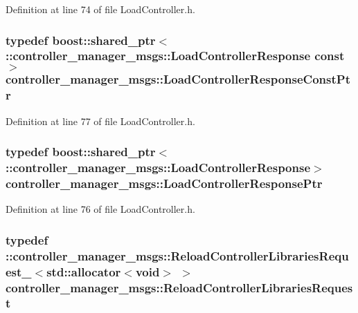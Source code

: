 \-Definition at line 74 of file \-Load\-Controller.\-h.

\subsubsection[{\-Load\-Controller\-Response\-Const\-Ptr}]{\setlength{\rightskip}{0pt plus 5cm}typedef boost\-::shared\-\_\-ptr$<$ \-::{\bf controller\-\_\-manager\-\_\-msgs\-::\-Load\-Controller\-Response} const$>$ {\bf controller\-\_\-manager\-\_\-msgs\-::\-Load\-Controller\-Response\-Const\-Ptr}}\label{namespacecontroller__manager__msgs_a96f25f07fcb264e102c04272ebe12192}


\-Definition at line 77 of file \-Load\-Controller.\-h.

\subsubsection[{\-Load\-Controller\-Response\-Ptr}]{\setlength{\rightskip}{0pt plus 5cm}typedef boost\-::shared\-\_\-ptr$<$ \-::{\bf controller\-\_\-manager\-\_\-msgs\-::\-Load\-Controller\-Response}$>$ {\bf controller\-\_\-manager\-\_\-msgs\-::\-Load\-Controller\-Response\-Ptr}}\label{namespacecontroller__manager__msgs_a1bc8103e4a8142aeef32bb6e8d9ef621}


\-Definition at line 76 of file \-Load\-Controller.\-h.

\subsubsection[{\-Reload\-Controller\-Libraries\-Request}]{\setlength{\rightskip}{0pt plus 5cm}typedef \-::{\bf controller\-\_\-manager\-\_\-msgs\-::\-Reload\-Controller\-Libraries\-Request\-\_\-}$<$std\-::allocator$<$void$>$ $>$ {\bf controller\-\_\-manager\-\_\-msgs\-::\-Reload\-Controller\-Libraries\-Request}}\label{namespacecontroller__manager__msgs_af91e529eb59a0113296a115e6c838323}


